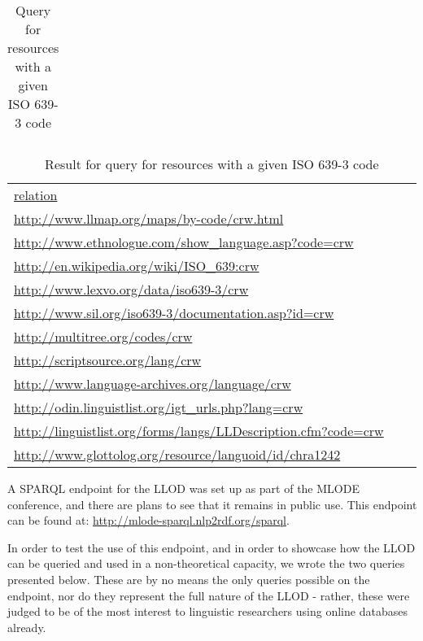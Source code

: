
\begin{center}
\begin{table*}[t!hbp]
\caption{Query for resources with a given ISO 639-3 code} \label{t1}
\begin{tabular}{lll}
\hline
{\footnotesize } \\
\hline
\end{tabular}
\end{table*}
\end{center}

\begin{table*}[b!htp]
\caption{Result for query for resources with a given ISO 639-3 code} \label{t1}
\begin{tabular}{lll}
\hline
\url{relation} \\
\url{http://www.llmap.org/maps/by-code/crw.html} \\
\url{http://www.ethnologue.com/show_language.asp?code=crw} \\
\url{http://en.wikipedia.org/wiki/ISO_639:crw} \\
\url{http://www.lexvo.org/data/iso639-3/crw} \\
\url{http://www.sil.org/iso639-3/documentation.asp?id=crw} \\
\url{http://multitree.org/codes/crw} \\
\url{http://scriptsource.org/lang/crw} \\
\url{http://www.language-archives.org/language/crw} \\
\url{http://odin.linguistlist.org/igt_urls.php?lang=crw} \\
\url{http://linguistlist.org/forms/langs/LLDescription.cfm?code=crw} \\
\url{http://www.glottolog.org/resource/languoid/id/chra1242} \\
\hline
\end{tabular}
\end{table*}

A SPARQL endpoint for the LLOD was set up as part of the MLODE conference, and there are plans to see that it remains in public use. This endpoint can be found at: \url{http://mlode-sparql.nlp2rdf.org/sparql}. 

In order to test the use of this endpoint, and in order to showcase how the LLOD can be queried and used in a non-theoretical capacity, we wrote the two queries presented below. These are by no means the only queries possible on the endpoint, nor do they represent the full nature of the LLOD - rather, these were judged to be of the most interest to linguistic researchers using online databases already. 

